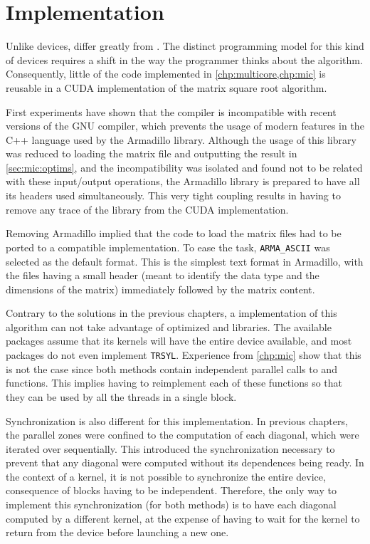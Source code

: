 \documentclass[../thesis]{subfiles}
\begin{document}
	\section{Implementation}
	\label{sec:cuda:implementation}
	
	Unlike \mic devices, \gpus differ greatly from \cpus. The distinct programming model for this kind of devices requires a shift in the way the programmer thinks about the algorithm. Consequently, little of the code implemented in \cref{chp:multicore,chp:mic} is reusable in a CUDA implementation of the matrix square root algorithm.

	First experiments have shown that the \nvidia compiler is incompatible with recent versions of the GNU compiler, which prevents the usage of modern features in the C++ language used by the Armadillo library. Although the usage of this library was reduced to loading the matrix file and outputting the result in \cref{sec:mic:optims}, and the incompatibility was isolated and found not to be related with these input/output operations, the Armadillo library is prepared to have all its headers used simultaneously. This very tight coupling results in having to remove any trace of the library from the CUDA implementation.

	Removing Armadillo implied that the code to load the matrix files had to be ported to a compatible implementation. To ease the task, \texttt{ARMA\_ASCII} was selected as the default format. This is the simplest text format in Armadillo, with the files having a small header (meant to identify the data type and the dimensions of the matrix) immediately followed by the matrix content.

	Contrary to the solutions in the previous chapters, a \cuda implementation of this algorithm can not take advantage of optimized \blas and \lapack libraries. The available packages assume that its kernels will have the entire device available, and most \lapack packages do not even implement \texttt{TRSYL}. Experience from \cref{chp:mic} show that this is not the case since both methods contain independent parallel calls to \blas and \lapack functions. This implies having to reimplement each of these functions so that they can be used by all the threads in a single \cuda block.

	Synchronization is also different for this implementation. In previous chapters, the parallel zones were confined to the computation of each diagonal, which were iterated over sequentially. This introduced the synchronization necessary to prevent that any diagonal were computed without its dependences being ready. In the context of a \cuda kernel, it is not possible to synchronize the entire device, consequence of blocks having to be independent. Therefore, the only way to implement this synchronization (for both methods) is to have each diagonal computed by a different kernel, at the expense of having to wait for the kernel to return from the device before launching a new one.
\end{document}
